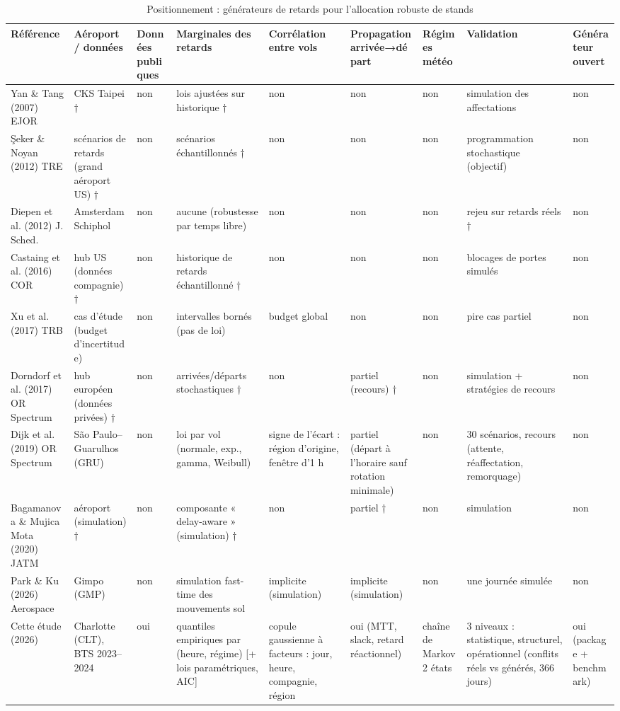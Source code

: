 \begin{table}
\caption{Positionnement : générateurs de retards pour l'allocation robuste de stands}
\label{tab:lit1}
\begin{tabular}{lllllllll}
\toprule
Référence & Aéroport / données & Données publiques & Marginales des retards & Corrélation entre vols & Propagation arrivée→départ & Régimes météo & Validation & Générateur ouvert \\
\midrule
Yan \& Tang (2007) EJOR & CKS Taipei † & non & lois ajustées sur historique † & non & non & non & simulation des affectations & non \\
Şeker \& Noyan (2012) TRE & scénarios de retards (grand aéroport US) † & non & scénarios échantillonnés † & non & non & non & programmation stochastique (objectif) & non \\
Diepen et al. (2012) J. Sched. & Amsterdam Schiphol & non & aucune (robustesse par temps libre) & non & non & non & rejeu sur retards réels † & non \\
Castaing et al. (2016) COR & hub US (données compagnie) † & non & historique de retards échantillonné † & non & non & non & blocages de portes simulés & non \\
Xu et al. (2017) TRB & cas d'étude (budget d'incertitude) & non & intervalles bornés (pas de loi) & budget global & non & non & pire cas partiel & non \\
Dorndorf et al. (2017) OR Spectrum & hub européen (données privées) † & non & arrivées/départs stochastiques † & non & partiel (recours) † & non & simulation + stratégies de recours & non \\
Dijk et al. (2019) OR Spectrum & São Paulo–Guarulhos (GRU) & non & loi par vol (normale, exp., gamma, Weibull) & signe de l'écart : région d'origine, fenêtre d'1 h & partiel (départ à l'horaire sauf rotation minimale) & non & 30 scénarios, recours (attente, réaffectation, remorquage) & non \\
Bagamanova \& Mujica Mota (2020) JATM & aéroport (simulation) † & non & composante « delay-aware » (simulation) † & non & partiel † & non & simulation & non \\
Park \& Ku (2026) Aerospace & Gimpo (GMP) & non & simulation fast-time des mouvements sol & implicite (simulation) & implicite (simulation) & non & une journée simulée & non \\
Cette étude (2026) & Charlotte (CLT), BTS 2023–2024 & oui & quantiles empiriques par (heure, régime) [+ lois paramétriques, AIC] & copule gaussienne à facteurs : jour, heure, compagnie, région & oui (MTT, slack, retard réactionnel) & chaîne de Markov 2 états & 3 niveaux : statistique, structurel, opérationnel (conflits réels vs générés, 366 jours) & oui (package + benchmark) \\
\bottomrule
\end{tabular}
\end{table}

